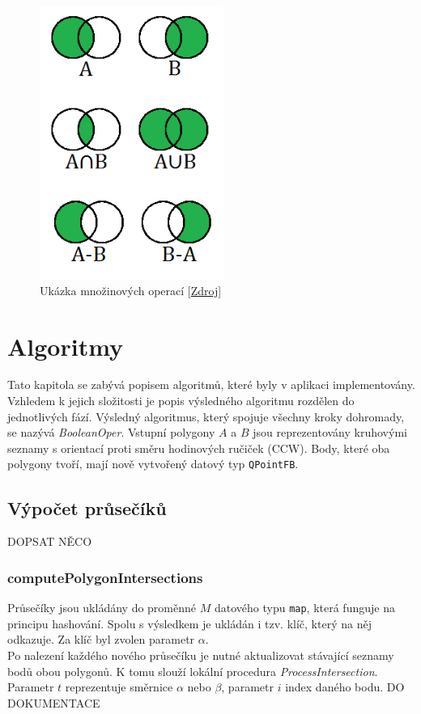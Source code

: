 \documentclass[a4paper, 12pt]{article}
\begin{document}
\begin{figure}[h!]
	\centering
	\includegraphics[width=6cm]{./pictures/operations.png}
	\caption{Ukázka množinových operací [\href{http://www.efgh.com/math/algebra/sets.htm}{Zdroj}]}
\end{figure}

\section{Algoritmy}
Tato kapitola se zabývá popisem algoritmů, které byly v aplikaci implementovány. Vzhledem k jejich složitosti je popis výsledného algoritmu rozdělen do jednotlivých fází. Vý\-sled\-ný algoritmus, který spojuje všechny kroky dohromady, se nazývá \textit{BooleanOper}. Vstupní polygony $A$ a $B$ jsou reprezentovány kruhovými seznamy s orientací proti směru hodinových ručiček (CCW). Body, které oba polygony tvoří, mají nově vytvořený datový typ \texttt{QPointFB}.

\subsection{Výpočet průsečíků}
DOPSAT NĚCO
\subsubsection{computePolygonIntersections}
Průsečíky jsou ukládány do proměnné $M$ datového typu \texttt{map}, která funguje na principu hashování. Spolu s výsledkem je ukládán i tzv. klíč, který na něj odkazuje. Za klíč byl zvolen parametr $\alpha$.\\

Po nalezení každého nového průsečíku je nutné aktualizovat stávající seznamy bodů obou polygonů. K tomu slouží lokální procedura \textit{ProcessIntersection}. Parametr $t$ reprezentuje směrnice $\alpha$ nebo $\beta$, parametr $i$ index daného bodu. DO DOKUMENTACE\\
\end{document}
